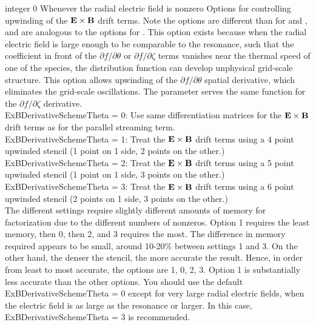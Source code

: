 {integer}
{0}
{Whenever the radial electric field is nonzero}
{Options for controlling upwinding of the ${\mathbf E}\times{\mathbf B}$ drift terms.  Note the options are different than for 
and , and are analogous to the options for .
This option exists because when the radial electric field is large enough to be comparable to the resonance,
such that the coefficient in front of the $\partial f/\partial \theta$ or $\partial f/\partial\zeta$ terms vanishes near the thermal speed of one of the species,
the distribution function can develop unphysical grid-scale structure.  This option allows upwinding of the $\partial f/\partial\theta$
spatial derivative, which eliminates the grid-scale oscillations.
The parameter  serves the same function for the $\partial f/\partial\zeta$ derivative.
\\

{\ttfamily ExBDerivativeSchemeTheta} = 0: Use same differentiation matrices for the ${\mathbf E}\times{\mathbf B}$ drift terms as for the parallel streaming term.\\

{\ttfamily ExBDerivativeSchemeTheta} = 1: Treat the ${\mathbf E}\times{\mathbf B}$ drift terms using a 4 point upwinded stencil (1 point on 1 side, 2 points on the other.)\\

{\ttfamily ExBDerivativeSchemeTheta} = 2: Treat the ${\mathbf E}\times{\mathbf B}$ drift terms using a 5 point upwinded stencil (1 point on 1 side, 3 points on the other.)\\

{\ttfamily ExBDerivativeSchemeTheta} = 3: Treat the ${\mathbf E}\times{\mathbf B}$ drift terms using a 6 point upwinded stencil (2 points on 1 side, 3 points on the other.)\\

The different settings require slightly different amounts of memory for factorization due to the different numbers of nonzeros. Option 1 requires the least memory, then 0, then 2,
and 3 requires the most.  The difference in memory required appears to be small, around 10-20\% between settings 1 and 3.
On the other hand, the denser the stencil, the more accurate the result. Hence, in order from least to most accurate, the options are 1, 0, 2, 3.
Option 1 is substantially less accurate than the other options.
You should use the default {\ttfamily ExBDerivativeSchemeTheta} = 0 except for very large radial electric fields, when the electric field is as large as the resonance or larger.
In this case, {\ttfamily ExBDerivativeSchemeTheta} = 3 is recommended.
}

